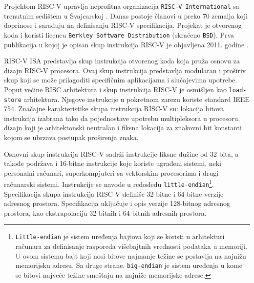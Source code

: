 \documentclass[12pt,oneside]{memoir}
\begin{document}
Projektom RISC-V upravlja neprofitna organizacija \texttt{RISC-V International} sa trenutnim sedištem u Švajcarskoj \cite{riscv_international}. Danas postoje članovi u preko 70 zemalja koji doprinose i sarađuju na definisanju RISC-V specifikacija. Projekat je otvorenog koda i koristi licencu \texttt{Berkley Software Distribution} (skraćeno \texttt{BSD}).
Prva publikacija u kojoj je opisan skup instrukcija RISC-V je objavljena 2011. godine \cite{riscv_isa_publication}.

RISC-V ISA \cite{isa} predstavlja skup instrukcija otvorenog koda koja pruža osnovu za dizajn RISC-V procesora. Ovaj skup instrukcija predstavlja modularan i proširiv skup koji se može prilagoditi specifičnim aplikacijama i slučajevima upotrebe. Poput većine RISC arhitektura i skup instrukcija RISC-V je osmišljen kao \texttt{load-store} arhitektura. Njegove instrukcije u pokretnom zarezu koriste standard IEEE 754.
Značajne karakteristike skupa instrukcija RISC-V su: lokacija bitova instrukcija izabrana tako da pojednostave upotrebu multipleksora u procesoru, dizajn koji je arhitektonski neutralan i fiksna lokacija za znakovni bit konstanti kojom se ubrzava postupak proširenja znaka.

Osnovni skup instrukcija RISC-V
sadrži instrukcije fiksne dužine od 32 bita, a takođe podržava i 16-bitne instrukcije koje koriste ugrađeni sistemi, neki personalni računari, superkompjuteri sa vektorskim procesorima i drugi računarski sistemi. Instrukcije se navode u redosledu \texttt{little-endian}\footnote[1]{\texttt{Little-endian} je sistem uređenja bajtova koji se koristi u arhitekturi računara za definisanje rasporeda višebajtnih vrednosti podataka u memoriji. U ovom sistemu bajt koji nosi bitove najmanje težine se postavlja na najnižu memorijsku adresu. Sa druge strane, \texttt{big-endian} je sistem uređenja u kome se bitovi najveće težine smeštaju na najniže memorijske adrese.}. Specifikacija skupa instrukcija RISC-V definiše 32-bitne i 64-bitne verzije adresnog prostora. Specifikacija uključuje i opis verzije 128-bitnog adresnog prostora, kao ekstrapolaciju 32-bitnih i 64-bitnih adresnih prostora. %
\end{document}
